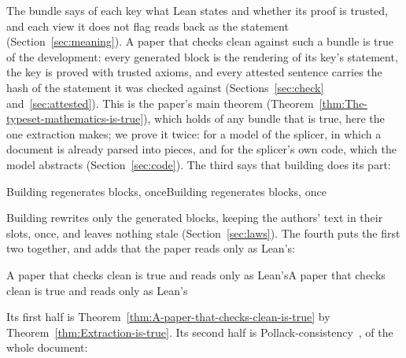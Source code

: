 \documentclass[acmsmall,screen,review,anonymous,nonacm]{acmart}
\begin{document}
\noindent The bundle says of each key what Lean states and whether its
proof is trusted, and each view it does not flag reads back as the
statement (Section~\ref{sec:meaning}). A paper that checks clean against
such a bundle is true of the development: every generated block is the
rendering of its key's statement, the key is proved with trusted axioms,
and every attested sentence carries the hash of the statement it was
checked against (Sections~\ref{sec:check} and~\ref{sec:attested}). This
is the paper's main theorem
(Theorem~\ref{thm:The-typeset-mathematics-is-true}), which holds of any
bundle that is true, here the one extraction makes; we prove it twice: for
a model of the splicer, in which a document is already parsed into pieces,
and for the splicer's own code, which the model abstracts
(Section~\ref{sec:code}). The third says that building does its part:

\begin{leantheorem}[sum=IQM5E09fop]{Building regenerates blocks, once}{Building regenerates blocks, once}
\label{thm:Building-regenerates-blocks,-once}
\end{leantheorem}

\noindent Building rewrites only the generated blocks, keeping the
authors' text in their slots, once, and leaves nothing stale
(Section~\ref{sec:laws}). The fourth puts the first two together, and adds
that the paper reads only as Lean's:

\begin{leantheorem}[sum=sWXEMdMl7w]{A paper that checks clean is true and reads only as Lean's}{A paper that checks clean is true and reads only as Lean's}
\label{thm:A-paper-that-checks-clean-is-true-and-reads-only-as-Lean's}
\end{leantheorem}

\noindent Its first half is Theorem~\ref{thm:A-paper-that-checks-clean-is-true}
by Theorem~\ref{thm:Extraction-is-true}. Its
second half is Pollack-consistency~\cite{Pollack98,Wiedijk12}, of the whole
document:
\end{document}
